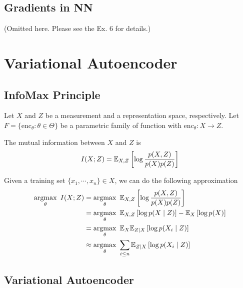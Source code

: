 \subsection{Gradients in NN}
(Omitted here. Please see the Ex. 6 for details.)

\section{Variational Autoencoder}

\subsection{InfoMax Principle}
Let $X$ and $Z$ be a measurement and a representation space, respectively. Let $F = \{\mathrm{enc}_\theta: \theta \in \Theta\}$ be a parametric family of function with $\mathrm{enc}_\theta: X \rightarrow Z$.

\begin{definition}
	The mutual information between $X$ and $Z$ is
	$$
	I(X; Z) = \mathbb{E}_{X,Z}\left[ \log \frac{p(X, Z)}{p(X)p(Z)} \right]
	$$
\end{definition}

\begin{definition}
	Given a training set $\{x_1, \cdots, x_n\} \in X$, we can do the following approximation 
	$$
	\begin{aligned}
			\argmax_\theta\ I(X; Z) &= \argmax_\theta\ \EE_{X,Z}\left[ \log \frac{p(X, Z)}{p(X)p(Z)} \right] \\
			&= \argmax_\theta\ \EE_{X, Z}\left[ \log p(X \mid Z) \right] - \EE_{X}\left[ \log p(X) \right] \\
			&= \argmax_\theta\ \EE_X \EE_{Z \mid X} \left[ \log p(X_i \mid Z) \right] \\
			&\approx \argmax_\theta\ \sum_{i \leq n} \EE_{Z \mid X} \left[ \log p(X_i \mid Z) \right] 
	\end{aligned}
	$$
	
\end{definition}

\subsection{Variational Autoencoder}

